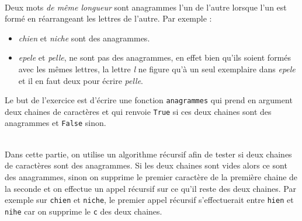 \documentclass[11pt,a4paper]{article}
\begin{document}
\begin{Exercise}[title={Somme de termes consécutifs}]
{	}
	\ifcorrige
	\fi
\end{Exercise}


\begin{Exercise}[title = {anagrammes}] \\
	Deux mots \textit{de même longueur} sont anagrammes l'un de l'autre lorsque l'un est formé en réarrangeant les lettres de l'autre. Par exemple :
	\begin{itemize}
		\item \textit{chien} et \textit{niche} sont des anagrammes.
		\item \textit{epele} et \textit{pelle}, ne sont pas des anagrammes, en effet bien qu'ils soient formés avec les mêmes lettres, la lettre \textit{l} ne figure qu'à un seul exemplaire dans \textit{epele} et il en faut deux pour écrire \textit{pelle}.
	\end{itemize}
	Le but de l'exercice est d'écrire une fonction {\tt anagrammes} qui prend en argument deux chaines de caractères et qui renvoie {\tt True} si ces deux chaines sont des anagrammes et {\tt False} sinon.

	\ExePart[name = Une approche récursive]\\
Dans cette partie, on utilise un algorithme récursif afin de tester si deux chaines de caractères sont des anagrammes. Si les deux chaines sont vides alors ce sont des anagrammes, sinon on supprime le premier caractère de la première chaine de la seconde et on effectue un appel récursif sur ce qu'il reste des deux chaines. Par exemple sur {\tt chien} et {\tt niche}, le premier appel récursif s'effectuerait entre {\tt hien} et {\tt nihe} car on supprime le {\tt c} des deux chaines. 
	

\end{Exercise}
\end{document}
